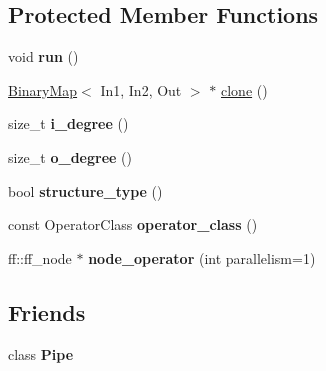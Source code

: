 \subsection*{\-Protected \-Member \-Functions}
\begin{DoxyCompactItemize}
\item 
\hypertarget{class_binary_map_a4cb82813b17f67bc603e588b8590c315}{void {\bfseries run} ()}\label{class_binary_map_a4cb82813b17f67bc603e588b8590c315}

\item 
\hyperlink{class_binary_map}{\-Binary\-Map}$<$ \-In1, \-In2, \-Out $>$ $\ast$ \hyperlink{class_binary_map_a5ee518543d1593d6ae4a443b95461f70}{clone} ()
\item 
\hypertarget{class_binary_map_ab57a24e23e0a80e17f6b6a8bf2461d0e}{size\-\_\-t {\bfseries i\-\_\-degree} ()}\label{class_binary_map_ab57a24e23e0a80e17f6b6a8bf2461d0e}

\item 
\hypertarget{class_binary_map_a797b1d9ba0e907ed25865315e7e0dc1a}{size\-\_\-t {\bfseries o\-\_\-degree} ()}\label{class_binary_map_a797b1d9ba0e907ed25865315e7e0dc1a}

\item 
\hypertarget{class_binary_map_a2c00076ce44f296a9fc41994c2e3e162}{bool {\bfseries structure\-\_\-type} ()}\label{class_binary_map_a2c00076ce44f296a9fc41994c2e3e162}

\item 
\hypertarget{class_binary_map_a41145194d0d78b9eb3ad0b35ebd30da2}{const \-Operator\-Class {\bfseries operator\-\_\-class} ()}\label{class_binary_map_a41145194d0d78b9eb3ad0b35ebd30da2}

\item 
\hypertarget{class_binary_map_a85c8ad2742ee861b45b40360be1022db}{ff\-::ff\-\_\-node $\ast$ {\bfseries node\-\_\-operator} (int parallelism=1)}\label{class_binary_map_a85c8ad2742ee861b45b40360be1022db}

\end{DoxyCompactItemize}
\subsection*{\-Friends}
\begin{DoxyCompactItemize}
\item 
\hypertarget{class_binary_map_adb788d0aa2d64624d3602a985936d7da}{class {\bfseries \-Pipe}}\label{class_binary_map_adb788d0aa2d64624d3602a985936d7da}

\end{DoxyCompactItemize}


